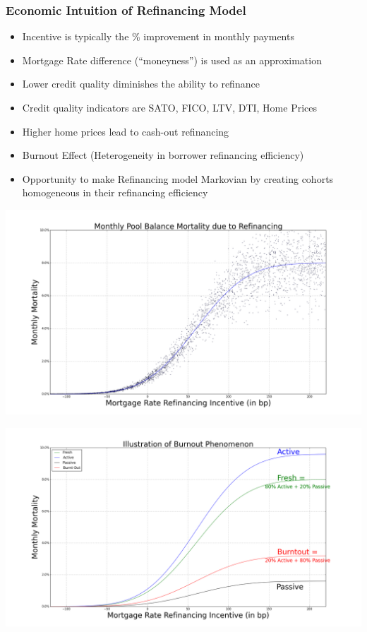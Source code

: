 \documentclass{beamer}
\begin{document}
\begin{frame}
\frametitle{Economic Intuition of Refinancing Model}
\begin{itemize}
\item Incentive is typically the \% improvement in monthly payments
\item Mortgage Rate difference (``moneyness'') is used as an approximation
\item Lower credit quality diminishes the ability to refinance
\item Credit quality indicators are SATO, FICO, LTV, DTI, Home Prices
\item Higher home prices lead to cash-out refinancing
\item Burnout Effect (Heterogeneity in borrower refinancing efficiency)
\item Opportunity to make Refinancing model Markovian by creating cohorts homogeneous in their refinancing efficiency
\end{itemize}
\end{frame}

\begin{frame}
\includegraphics[scale=0.26]{refi_scurve.png}
\end{frame}

\begin{frame}
\includegraphics[scale=0.25]{burnout.png}
\end{frame}
\end{document}
